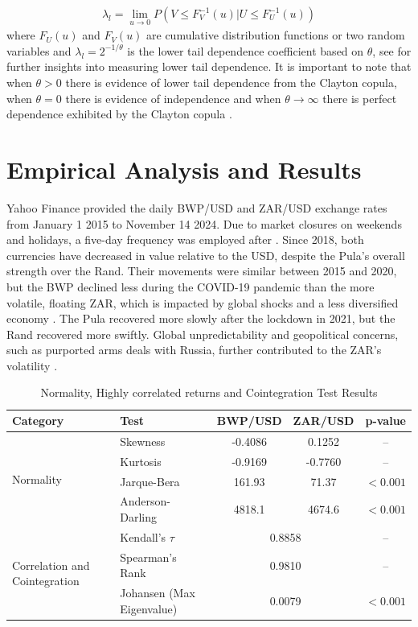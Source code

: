 \documentclass[a4paper]{article}
\theoremstyle{plain}
\theoremstyle{definition}
\theoremstyle{remark}
\begin{document}
\begin{align}
    \lambda_{l} = \lim_{u \to 0} P(V \leq F^{-1}_{V}(u) | U \leq F^{-1}_{U}(u)) 
\end{align}
where $F_{U}(u)$ and $F_{V}(u)$ are cumulative distribution functions or two random variables and $ \lambda_{l} = 2^{-1/\theta}$ is the lower tail dependence coefficient based on $\theta$, see \cite{HUA20111454} for further insights into measuring lower tail dependence. It is important to note that when $\theta > 0$ there is evidence of lower tail dependence from the Clayton copula, when $\theta = 0$ there is evidence of independence and when $\theta \to \infty $ there is perfect dependence exhibited by the Clayton copula \citep{nelsen2006archimedean}.

\section{Empirical Analysis and Results}
Yahoo Finance provided the daily BWP/USD and ZAR/USD exchange rates from January 1 2015 to November 14 2024. Due to market closures on weekends and holidays, a five-day frequency was employed after \cite{makatjane2024forecasting}. Since 2018, both currencies have decreased in value relative to the USD, despite the Pula's overall strength over the Rand. Their movements were similar between 2015 and 2020, but the BWP declined less during the COVID-19 pandemic than the more volatile, floating ZAR, which is impacted by global shocks and a less diversified economy \citep{Thupeng2021,masuku2016relationship}. The Pula recovered more slowly after the lockdown in 2021, but the Rand recovered more swiftly. Global unpredictability and geopolitical concerns, such as purported arms deals with Russia, further contributed to the ZAR's volatility \citep{ryan2023understanding}.

\begin{table}[ht]
\centering
\caption{Normality, Highly correlated returns and Cointegration Test Results}
\label{tab:table1}
\scriptsize
\vspace{0.3cm}
\begin{tabular}{llccc}
\toprule
\textbf{Category} & \textbf{Test} & \textbf{BWP/USD} & \textbf{ZAR/USD}& \textbf{p-value} \\
\midrule
\multirow{4}{*}{Normality} 
  & Skewness & -0.4086 & 0.1252 & -- \\
  & Kurtosis & -0.9169 & -0.7760& -- \\
  & Jarque-Bera & 161.93 & 71.37 & $<0.001$ \\
  & Anderson-Darling & 4818.1 & 4674.6& $<0.001$ \\
\midrule
\multirow{3}{*}{Correlation and Cointegration}
  & Kendall's $\tau$ & \multicolumn{2}{c}{0.8858} & -- & -- \\
  & Spearman's Rank & \multicolumn{2}{c}{0.9810} & -- & -- \\
  & Johansen (Max Eigenvalue) & \multicolumn{2}{c}{0.0079} & $<0.001$ \\
\bottomrule
\end{tabular}
\end{table}
\end{document}
